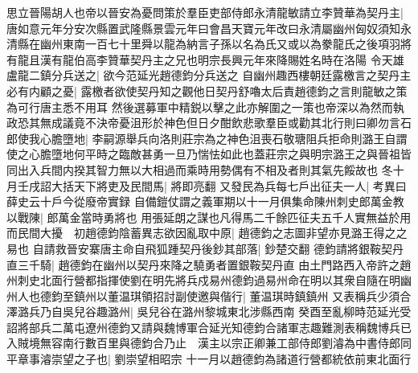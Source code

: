 思立晉陽胡人也帝以晉安為憂問策於羣臣吏部侍郎永清龍敏請立李贊華為契丹主|{
	唐如意元年分安次縣置武隆縣景雲元年曰會昌天寶元年改曰永清屬幽州匈奴須知永清縣在幽州東南一百七十里舜以龍為納言子孫以名為氏又或以為豢龍氏之後項羽將有龍且漢有龍伯高李贊華契丹主之兄也明宗長興元年來降賜姓名時在洛陽}
令天雄盧龍二鎮分兵送之|{
	欲今范延光趙德鈞分兵送之}
自幽州趣西樓朝廷露檄言之契丹主必有内顧之憂|{
	露檄者欲使契丹知之觀他日契丹舒嚕太后責趙德鈞之言則龍敏之策為可行唐主悉不用耳}
然後選募軍中精鋭以擊之此亦解圍之一策也帝深以為然而執政恐其無成議竟不決帝憂沮形於神色但日夕酣飲悲歌羣臣或勸其北行則曰卿勿言石郎使我心膽墮地|{
	李嗣源舉兵向洛則莊宗為之神色沮喪石敬瑭阻兵拒命則潞王自謂使之心膽墮地何平時之臨敵甚勇一旦乃惴怯如此也蓋莊宗之與明宗潞王之與晉祖皆同出入兵間内揆其智力無以大相過而乘時用勢偶有不相及者則其氣先餒故也}
冬十月壬戌詔大括天下將吏及民間馬|{
	將即亮翻}
又發民為兵每七戶出征夫一人|{
	考異曰薛史云十戶今從廢帝實録}
自備鎧仗謂之義軍期以十一月俱集命陳州刺史郎萬金教以戰陳|{
	郎萬金當時勇將也}
用張延朗之謀也凡得馬二千餘匹征夫五千人實無益於用而民間大擾　初趙德鈞陰蓄異志欲因亂取中原|{
	趙德鈞之志圖非望亦見潞王得之之易也}
自請救晉安寨唐主命自飛狐踵契丹後鈔其部落|{
	鈔楚交翻}
德鈞請將銀鞍契丹直三千騎|{
	趙德鈞在幽州以契丹來降之驍勇者置銀鞍契丹直}
由土門路西入帝許之趙州刺史北面行營都指揮使劉在明先將兵戍易州德鈞過易州命在明以其衆自隨在明幽州人也德鈞至鎮州以董温琪領招討副使邀與偕行|{
	董温琪時鎮鎮州}
又表稱兵少須合澤潞兵乃自吳兒谷趣潞州|{
	吳兒谷在潞州黎城東北涉縣西南}
癸酉至亂柳時范延光受詔將部兵二萬屯遼州德鈞又請與魏博軍合延光知德鈞合諸軍志趣難測表稱魏博兵已入賊境無容南行數百里與德鈞合乃止　漢主以宗正卿兼工部侍郎劉濬為中書侍郎同平章事濬崇望之子也|{
	劉崇望相昭宗}
十一月以趙德鈞為諸道行營都統依前東北面行

